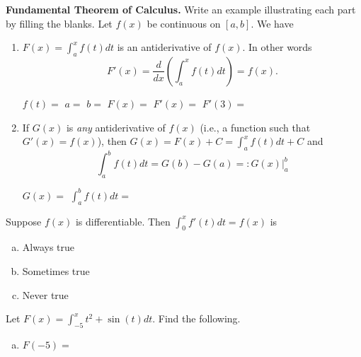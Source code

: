 \documentclass[answers]{exam}
\begin{document}
\begin{questions}

\question \textbf{Fundamental Theorem of Calculus.} Write an example illustrating each part by filling the blanks. Let $f(x)$ be continuous on $[a, b]$. We have

\begin{enumerate}[(1)]
	
	\item $F(x) = \int_{a}^x f(t) dt$ is an antiderivative of $f(x)$. In other words
	\[ F'(x) = \frac{d}{dx}\left( \int_{a}^x f(t) dt \right) = f(x). \]
	

	\hfill \break
$f(t) =$ \hspace{0.5in} $a = $ \hspace{0.2 in} $b = $ \hspace{0.2in} $F(x) = $ \hspace{1.5in} $F'(x) = $ \hspace{0.5in} $F'(3) = $
	\hfill \break
	
	\item If $G(x)$ is \emph{any} antiderivative of $f(x)$ (i.e., a function such that $G'(x) = f(x)$), then $G(x) = F(x) + C = \int_{a}^x f(t) dt + C$ and 
	\[ \int_{a}^b f(t) dt = G(b) - G(a) =: G(x)\bigg\rvert_a^b\]


\hfill \break
$G(x)= $ \hspace{1in} $\displaystyle \int_{a}^b f(t) dt = $
\hfill \break

\end{enumerate}

\question Suppose $f(x)$ is differentiable. Then $\displaystyle \int_0^x f'(t) dt = f(x)$ is

\begin{enumerate}[(a)]
	
	\item Always true
	
	\item Sometimes true
	
	\item Never true
	
\end{enumerate}






\question Let $\displaystyle F(x) = \int_{-5}^x t^2+\sin(t) dt$. Find the following.


\begin{enumerate}[(a)]
	
	\item $F(-5) = $
	

\end{enumerate}
\end{questions}
\end{document}
